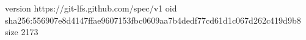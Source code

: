 version https://git-lfs.github.com/spec/v1
oid sha256:556907e8d4147ffae9607153fbc0609aa7b4dedf77cd61d1c067d262c419d9b8
size 2173
